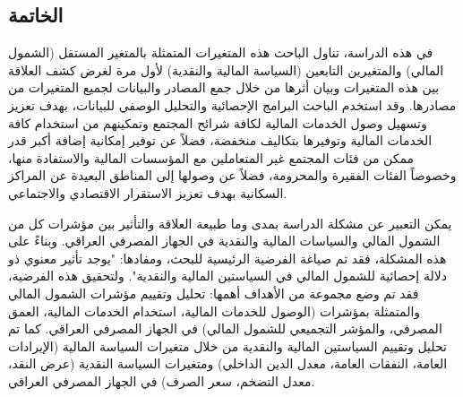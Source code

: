 \documentclass[10pt,a4paper]{report}
\newcommand{\myspace}{\hspace*{1cm}}
\begin{document}
\begin{doublespacing}
\section*{الخاتمة}
\myspace 
في هذه الدراسة، تناول الباحث هذه المتغيرات المتمثلة بالمتغير المستقل (الشمول المالي) والمتغيرين التابعين (السياسة المالية والنقدية) لأول مرة لغرض كشف العلاقة بين هذه المتغيرات وبيان أثرها من خلال جمع المصادر والبيانات لجميع المتغيرات من مصادرها. وقد استخدم الباحث البرامج الإحصائية والتحليل الوصفي للبيانات، بهدف تعزيز وتسهيل وصول الخدمات المالية لكافة شرائح المجتمع وتمكينهم من استخدام كافة الخدمات المالية وتوفيرها بتكاليف منخفضة، فضلاً عن توفير إمكانية إضافة أكبر قدر ممكن من فئات المجتمع غير المتعاملين مع المؤسسات المالية والاستفادة منها، وخصوصاً الفئات الفقيرة والمحرومة، فضلاً عن وصولها إلى المناطق البعيدة عن المراكز السكانية بهدف تعزيز الاستقرار الاقتصادي والاجتماعي.

يمكن التعبير عن مشكلة الدراسة بمدى وما طبيعة العلاقة والتأثير بين مؤشرات كل من الشمول المالي والسياسات المالية والنقدية في الجهاز المصرفي العراقي. وبناءً على هذه المشكلة، فقد تم صياغة الفرضية الرئيسية للبحث، ومفادها: "يوجد تأثير معنوي ذو دلالة إحصائية للشمول المالي في السياستين المالية والنقدية". ولتحقيق هذه الفرضية، فقد تم وضع مجموعة من الأهداف أهمها: تحليل وتقييم مؤشرات الشمول المالي والمتمثلة بمؤشرات (الوصول للخدمات المالية، استخدام الخدمات المالية، العمق المصرفي، والمؤشر التجميعي للشمول المالي) في الجهاز المصرفي العراقي. كما تم تحليل وتقييم السياستين المالية والنقدية من خلال متغيرات السياسة المالية (الإيرادات العامة، النفقات العامة، معدل الدين الداخلي) ومتغيرات السياسة النقدية (عرض النقد، معدل التضخم، سعر الصرف) في الجهاز المصرفي العراقي.


\end{doublespacing}
\end{document}

